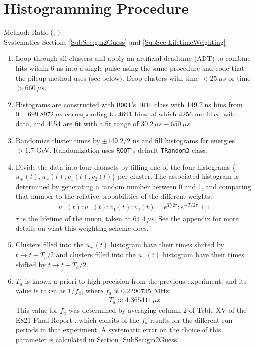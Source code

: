 \section{Histogramming Procedure}

	Method: Ratio (, \cite{DenverRatioTalk}) \\
	\noindent Systematics Sections \ref{SubSec:gm2Guess} and \ref{SubSec:LifetimeWeighting}

	\begin{enumerate}
		\item{Loop through all clusters and apply an artificial deadtime (ADT) to combine hits within 6 ns into a single pulse using the same procedure and code that the pileup method uses (see below). Drop clusters with time $< \SI{25}{\mu s}$ or time $> \SI{660}{\mu s}$.}
		\item{Histograms are constructed with \texttt{ROOT}'s \texttt{TH1F} class with 149.2 ns bins from $0 - \SI{699.8972}{\mu s}$ corresponding to 4691 bins, of which 4256 are filled with data, and 4154 are fit with a fit range of $\SI{30.2}{\mu s} - \SI{650}{\mu s}$.}
		\item{Randomize cluster times by $\pm 149.2/2$ ns and fill histograms for energies $> 1.7$ GeV. Randomization uses \texttt{ROOT}'s default \texttt{TRandom3} class.}
		\item{Divide the data into four datasets by filling one of the four histograms \{$u_{+}(t), u_{-}(t), v_{1}(t), v_{2}(t)$\} per cluster. The associated histogram is determined by generating a random number between 0 and 1, and comparing that number to the relative probabilities of the different weights:
			\begin{align}
				u_{+}(t) : u_{-}(t) : v_{1}(t) : v_{2}(t) = e^{T/2\tau} : e^{-T/2\tau} : 1 : 1
			\end{align}
		$\tau$ is the lifetime of the muon, taken at $\SI{64.4}{\mu s}$. See the appendix for more details on what this weighting scheme does.}
		\item{Clusters filled into the $u_{+}(t)$ histogram have their times shifted by $t \rightarrow t - T_{a}/2$ and clusters filled into the $u_{-}(t)$ histogram have their times shifted by $t \rightarrow t + T_{a}/2$.}
		\item{$T_{a}$ is known a priori to high precision from the previous experiment, and its value is taken as $1/f_{a}$, where $f_{a}$ is \SI{0.2290735}{MHz}:
			\begin{align}
				T_{a} \approx \SI{4.365411}{\mu s}
			\label{eq:Ta}
			\end{align}
		This value for $f_{a}$ was determined by averaging column 2 of Table XV of the E821 Final Report \cite{E821FinalReport}, which consits of the $f_{a}$ results for the different run periods in that experiment. A systematic error on the choice of this parameter is calculated in Section \ref{SubSec:gm2Guess}.}
	\end{enumerate}

